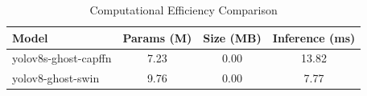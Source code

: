 
\begin{table}[htbp]
\centering
\caption{Computational Efficiency Comparison}
\label{tab:efficiency}
\begin{tabular}{lccc}
\toprule
\textbf{Model} & \textbf{Params (M)} & \textbf{Size (MB)} & \textbf{Inference (ms)} \\
\midrule
yolov8s-ghost-capffn & 7.23 & 0.00 & 13.82 \\
yolov8-ghost-swin & 9.76 & 0.00 & 7.77 \\

\bottomrule
\end{tabular}
\end{table}
